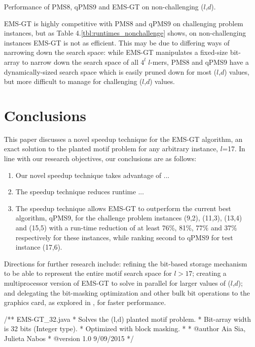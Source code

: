 \documentclass[oneside,12pt]{DISCSthesis}
\begin{document}
{\begin{table}[ht]
			\caption{\small Performance of PMS8, qPMS9 and EMS-GT on non-challenging ($l$,$d$).}
			\end{table}

		EMS-GT is highly competitive with PMS8 and qPMS9 on challenging problem instances, but as Table 4.\ref{tbl:runtimes_nonchallenge} shows, on non-challenging instances EMS-GT is not as efficient. This may be due to differing ways of narrowing down the search space: while EMS-GT manipulates a fixed-size bit-array to narrow down the search space of all $4^l$ $l$-mers, PMS8 and qPMS9 have a dynamically-sized search space which is easily pruned down for most ($l$,$d$) values, but more difficult to manage for challenging ($l$,$d$) values.

\chapter{Conclusions}
	This paper discusses a novel speedup technique for the EMS-GT algorithm, an exact solution to the planted motif problem for any arbitrary instance, $l$=17. In line with our research objectives, our conclusions are as follows:
	\begin{enumerate}
	\item Our novel speedup technique takes advantage of ...
	\item The speedup technique reduces runtime ...
	\item The speedup technique allows EMS-GT to outperform the current best algorithm, qPMS9, for the challenge problem instances (9,2), (11,3), (13,4) and (15,5) with a run-time reduction of at least 76\%, 81\%, 77\% and 37\% respectively for these instances, while ranking second to qPMS9 for test instance (17,6).
	\end{enumerate}

	\noindent Directions for further research include: refining the bit-based storage mechanism to be able to represent the entire motif search space for $l > 17$; creating a multiprocessor version of EMS-GT to solve in parallel for larger values of ($l$,$d$); and delegating the bit-masking optimization and other bulk bit operations to the graphics card, as explored in \cite{dasari2010efficient}, for faster performance.

\BackMatter



%


\begin{footnotesize}
\begin{verbatimtab}[2]
/** EMS-GT_32.java
  * Solves the (l,d) planted motif problem.
  * Bit-array width is 32 bits (Integer type).
  * Optimized with block masking.
  *
  * @author Aia Sia, Julieta Nabos
  * @version 1.0 9/09/2015
  */


\end{verbatimtab}
\end{footnotesize}}
\end{document}
